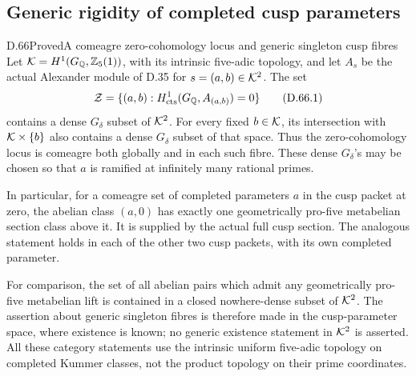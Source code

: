\subsection{Generic rigidity of completed cusp parameters}

\begin{statement}{D.66}{Proved}{A comeagre zero-cohomology locus and generic singleton cusp fibres}
Let \({\cal K}=H^1(G_{\mathbb Q},\mathbb Z_5(1))\), with
its intrinsic five-adic topology, and let \(A_s\) be the actual
Alexander module of D.35 for \(s=(a,b)\in{\cal K}^2\).
The set
\[
 {\cal Z}=\{(a,b):H^1_{\mathrm{cts}}(G_{\mathbb Q},A_{(a,b)})=0\}
                                                        \tag{D.66.1}
\]
contains a dense \(G_\delta\) subset of \({\cal K}^2\).
For every fixed \(b\in{\cal K}\), its intersection with
\({\cal K}\times\{b\}\) also contains a dense \(G_\delta\)
subset of that space. Thus the zero-cohomology locus is
comeagre both globally and in each such fibre. These dense
\(G_\delta\)'s may be chosen so that \(a\) is ramified at
infinitely many rational primes.

In particular, for a comeagre set of completed parameters
\(a\) in the cusp packet at zero, the abelian class \((a,0)\)
has exactly one geometrically pro-five metabelian section
class above it. It is supplied by the actual full cusp
section. The analogous statement holds in each of the other
two cusp packets, with its own completed parameter.

For comparison, the set of all abelian pairs which admit
any geometrically pro-five metabelian lift is contained
in a closed nowhere-dense subset of \({\cal K}^2\).
The assertion about generic singleton fibres is therefore
made in the cusp-parameter space, where existence is known;
no generic existence statement in \({\cal K}^2\) is asserted.
All these category statements use the intrinsic uniform
five-adic topology on completed Kummer classes, not the
product topology on their prime coordinates.
\end{statement}

